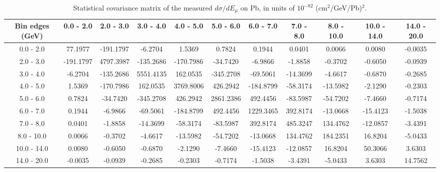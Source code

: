 \documentclass[aps,prl,twocolumn,superscriptaddress,nofootinbib]{revtex4-1}
\begin{document}
\begin{turnpage}
 \begin{table}[h!]
  \centering
  \caption{Statistical covariance matrix of the measured $d\sigma/dE_{\mu}$ on Pb, in units of $10^{-82}$ (cm$^{2}$/GeV/Pb)$^{2}$.}
    \begin{tabular}{c||cccccccccc}
      Bin edges (GeV) & 0.0 - 2.0 & 2.0 - 3.0 & 3.0 - 4.0 & 4.0 - 5.0 & 5.0 - 6.0 & 6.0 - 7.0 & 7.0 - 8.0 & 8.0 - 10.0 & 10.0 - 14.0 & 14.0 - 20.0 \\
\hline \hline
        0.0 - 2.0 & 77.1977 & -191.1797 & -6.2704 &  1.5369 &  0.7824 &  0.1944 &  0.0401 &  0.0066 &  0.0080 & -0.0035 \\
        2.0 - 3.0 & -191.1797 & 4797.3987 & -135.2686 & -170.7986 & -34.7420 & -6.9866 & -1.8858 & -0.3702 & -0.6050 & -0.0939 \\
        3.0 - 4.0 & -6.2704 & -135.2686 & 5551.4135 & 162.0535 & -345.2708 & -69.5061 & -14.3699 & -4.6617 & -0.6870 & -0.2685 \\
        4.0 - 5.0 &  1.5369 & -170.7986 & 162.0535 & 3769.8006 & 426.2942 & -184.8799 & -58.3174 & -13.5982 & -2.1290 & -0.2303 \\
        5.0 - 6.0 &  0.7824 & -34.7420 & -345.2708 & 426.2942 & 2861.2386 & 492.4456 & -83.5987 & -54.7202 & -7.4660 & -0.7174 \\
        6.0 - 7.0 &  0.1944 & -6.9866 & -69.5061 & -184.8799 & 492.4456 & 1229.3465 & 392.8174 & -13.0668 & -15.4123 & -1.5038 \\
        7.0 - 8.0 &  0.0401 & -1.8858 & -14.3699 & -58.3174 & -83.5987 & 392.8174 & 485.3247 & 134.4762 & -12.0857 & -3.4391 \\
       8.0 - 10.0 &  0.0066 & -0.3702 & -4.6617 & -13.5982 & -54.7202 & -13.0668 & 134.4762 & 184.2351 & 16.8204 & -5.0433 \\
      10.0 - 14.0 &  0.0080 & -0.6050 & -0.6870 & -2.1290 & -7.4660 & -15.4123 & -12.0857 & 16.8204 & 50.3066 &  3.6303 \\
      14.0 - 20.0 & -0.0035 & -0.0939 & -0.2685 & -0.2303 & -0.7174 & -1.5038 & -3.4391 & -5.0433 &  3.6303 & 14.7562 \\
    \end{tabular}
  \label{tablecov:Pb_Statistical_Emu}
  \end{table}
\end{turnpage}
\end{document}
